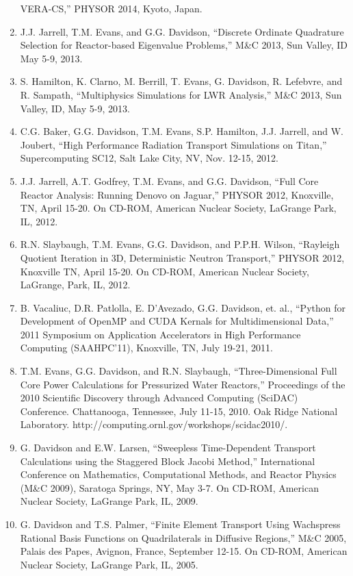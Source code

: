 \documentclass[letterpaper,11pt]{article}
\begin{document}
\begin{enumerate}
    VERA-CS,'' PHYSOR 2014, Kyoto, Japan.
  \item J.J. Jarrell, T.M. Evans, and G.G. Davidson, ``Discrete
    Ordinate Quadrature Selection for Reactor-based Eigenvalue
    Problems,'' M\&C 2013, Sun Valley, ID May 5-9, 2013.
  \item S. Hamilton, K. Clarno, M. Berrill, T. Evans, G. Davidson,
    R. Lefebvre, and R. Sampath, ``Multiphysics Simulations for LWR
    Analysis,'' M\&C 2013, Sun Valley, ID, May 5-9, 2013.
  \item C.G. Baker, G.G. Davidson, T.M. Evans, S.P. Hamilton,
    J.J. Jarrell, and W. Joubert, ``High Performance Radiation
    Transport Simulations on Titan,'' Supercomputing SC12, Salt Lake
    City, NV, Nov. 12-15, 2012.
  \item J.J. Jarrell, A.T. Godfrey, T.M. Evans, and G.G. Davidson,
    ``Full Core Reactor Analysis: Running Denovo on Jaguar,'' PHYSOR
    2012, Knoxville, TN, April 15-20. On CD-ROM, American Nuclear
    Society, LaGrange Park, IL, 2012.
  \item R.N. Slaybaugh, T.M. Evans, G.G. Davidson, and P.P.H. Wilson,
    ``Rayleigh Quotient Iteration in 3D, Deterministic Neutron
    Transport,'' PHYSOR 2012, Knoxville TN, April 15-20.  On CD-ROM,
    American Nuclear Society, LaGrange, Park, IL, 2012.
  \item B. Vacaliuc, D.R. Patlolla, E. D'Avezado, G.G. Davidson,
    et. al., ``Python for Development of OpenMP and CUDA Kernals for
    Multidimensional Data,'' 2011 Symposium on Application Accelerators
    in High Performance Computing (SAAHPC'11), Knoxville, TN, July
    19-21, 2011.
  \item T.M. Evans, G.G. Davidson, and R.N. Slaybaugh,
    ``Three-Dimensional Full Core Power Calculations for Pressurized
    Water Reactors,'' Proceedings of the 2010 Scientific Discovery
    through Advanced Computing (SciDAC) Conference. Chattanooga,
    Tennessee, July 11-15, 2010. Oak Ridge National
    Laboratory. http://computing.ornl.gov/workshops/scidac2010/.
  \item G. Davidson and E.W. Larsen, ``Sweepless Time-Dependent
    Transport Calculations using the Staggered Block Jacobi Method,''
    International Conference on Mathematics, Computational Methods,
    and Reactor Physics (M\&C 2009), Saratoga Springs, NY, May 3-7.  On
    CD-ROM, American Nuclear Society, LaGrange Park, IL, 2009.
  \item G. Davidson and T.S. Palmer, ``Finite Element Transport Using
    Wachspress Rational Basis Functions on Quadrilaterals in Diffusive
    Regions,'' M\&C 2005, Palais des Papes, Avignon, France, September
    12-15.  On CD-ROM, American Nuclear Society, LaGrange Park, IL,
    2005.
\end{enumerate}
\end{document}
